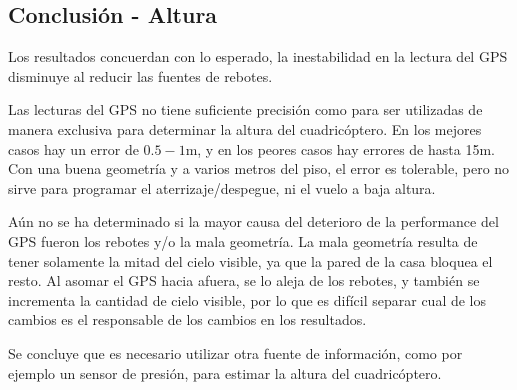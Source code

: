 \documentclass[spanish,12pt,a4paper,titlepage]{report}
\begin{document}

\subsection{Conclusión - Altura}
\label{sec:error-en-altura-conclusion}

Los resultados concuerdan con lo esperado, la inestabilidad en la lectura del GPS disminuye al reducir las fuentes de rebotes.

Las lecturas del GPS no tiene suficiente precisión como para ser utilizadas de manera exclusiva para determinar la altura del cuadricóptero. En los mejores casos hay un error de $0.5-1$m, y en los peores casos hay errores de hasta 15m. Con una buena geometría y a varios metros del piso, el error es tolerable, pero no sirve para programar el aterrizaje/despegue, ni el vuelo a baja altura.

Aún no se ha determinado si la mayor causa del deterioro de la performance del GPS fueron los rebotes y/o la mala geometría. La mala geometría resulta de tener solamente la mitad del cielo visible, ya que la pared de la casa bloquea el resto. Al asomar el GPS hacia afuera, se lo aleja de los rebotes, y también se incrementa la cantidad de cielo visible, por lo que es difícil separar cual de los cambios es el responsable de los cambios en los resultados.

Se concluye que es necesario utilizar otra fuente de información, como por ejemplo un sensor de presión, para estimar la altura del cuadricóptero.


%
%
%
%
%
\end{document}
